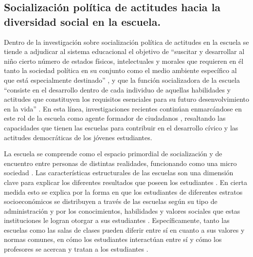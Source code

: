 \documentclass[12pt,twoside]{templates/facsothesis}
\begin{document}
\hypertarget{socializaciuxf3n-poluxedtica-de-actitudes-hacia-la-diversidad-social-en-la-escuela.}{%
\subsection{Socialización política de actitudes hacia la diversidad social en la escuela.}\label{socializaciuxf3n-poluxedtica-de-actitudes-hacia-la-diversidad-social-en-la-escuela.}}

Dentro de la investigación sobre socialización política de actitudes en la escuela se tiende a adjudicar al sistema educacional el objetivo de ``suscitar y desarrollar al niño cierto número de estados físicos, intelectuales y morales que requieren en él tanto la sociedad política en su conjunto como el medio ambiente específico al que está especialmente destinado'' \citep[p.~60]{durkheim_educacion_1999}, y que la función socializadora de la escuela ``consiste en el desarrollo dentro de cada individuo de aquellas habilidades y actitudes que constituyen los requisitos esenciales para su futuro desenvolvimiento en la vida'' \citep[p.~65]{parsons_clase_1976}. En esta línea, investigaciones recientes continúan enmarcándose en este rol de la escuela como agente formador de ciudadanos \citep{cox_Aprendizaje_2015, groof_Influence_2008, trevino_Influence_2017}, resaltando las capacidades que tienen las escuelas para contribuir en el desarrollo cívico y las actitudes democráticas de los jóvenes estudiantes.

La escuela se comprende como el espacio primordial de socialización y de encuentro entre personas de distintas realidades, funcionando como una micro sociedad \citep{groof_Influence_2008}. Las características estructurales de las escuelas son una dimensión clave para explicar los diferentes resultados que poseen los estudiantes \citep{trevino_Influence_2018}. En cierta medida esto se explica por la forma en que los estudiantes de diferentes estratos socioeconómicos se distribuyen a través de las escuelas según su tipo de administración \citep{bellei_estudio_2013} y por los conocimientos, habilidades y valores sociales que estas instituciones le logran otorgar a sus estudiantes \citep{groof_Influence_2008}. Específicamente, tanto las escuelas como las salas de clases pueden diferir entre sí en cuanto a sus valores y normas comunes, en cómo los estudiantes interactúan entre sí y cómo los profesores se acercan y tratan a los estudiantes \citep{bayramozdemir_How_2020}.
\end{document}
